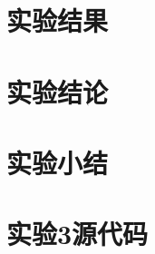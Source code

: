 ﻿\documentclass[UTF8,12pt]{article}
\begin{document}
\section{实验结果}

\section{实验结论}


\section{实验小结}


\newpage

\section{实验3源代码}
\begin{lstlisting}[frame=shadowbox]

\end{lstlisting}
\end{document}
